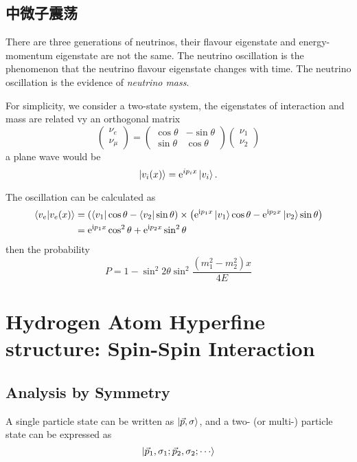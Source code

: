 
\section[Neutrino Oscillation]{中微子震荡}
There are three generations of neutrinos, their flavour eigenstate and energy-momentum eigenstate are not the same. The neutrino oscillation is the phenomenon that the neutrino flavour eigenstate changes with time. The neutrino oscillation is the evidence of \emph{neutrino mass}.

For simplicity, we consider a two-state system, the eigenstates of  interaction and mass are related vy an orthogonal matrix
\begin{equation}
    \begin{pmatrix}
        \nu_e \\ \nu_\mu
    \end{pmatrix}
    =
    \begin{pmatrix}
        \cos\theta & -\sin\theta \\
        \sin\theta & \cos\theta
    \end{pmatrix}
    \begin{pmatrix}
        \nu_1 \\ \nu_2
    \end{pmatrix}
\end{equation}
a plane wave would be 
\begin{equation}
  \ket{v_i(x)} = \mathrm{e}^{i p_i x} \ket{v_i}.
\end{equation}

The oscillation can be calculated as
\begin{align}
  \bra{v_e} \ket{v_e (x)} & = \left( \bra{v_1} \cos \theta - \bra{v_2} \sin \theta \right) \times \left( \mathrm{e}^{\mathrm{i}  p_1 x} \ket{v_1} \cos \theta - \mathrm{e}^{\mathrm{i}  p_2 x} \ket{v_2} \sin \theta \right)
  \\
  & = \mathrm{e}^{\mathrm{i} p_1 x} \cos^{2} \theta + \mathrm{e}^{\mathrm{i} p_2 x} \sin^{2} \theta
\end{align}
then the probability
\begin{equation}
  P = 1 - \sin ^{2} 2\theta \sin ^{2} \frac{\left( m_1^{2} - m_2^{2} \right) x }{4E}
\end{equation}

\chapter[氢原子的超精细结构]{Hydrogen Atom Hyperfine structure: Spin-Spin Interaction}
\section{Analysis by Symmetry}

A single particle state can be written as $\ket{\vec{p}, \sigma}$, and a two- (or multi-) particle state can be expressed as 
\begin{equation}
  \ket{\vec{p}_1, \sigma_1; \vec{p}_2, \sigma_2; \cdots}
\end{equation}